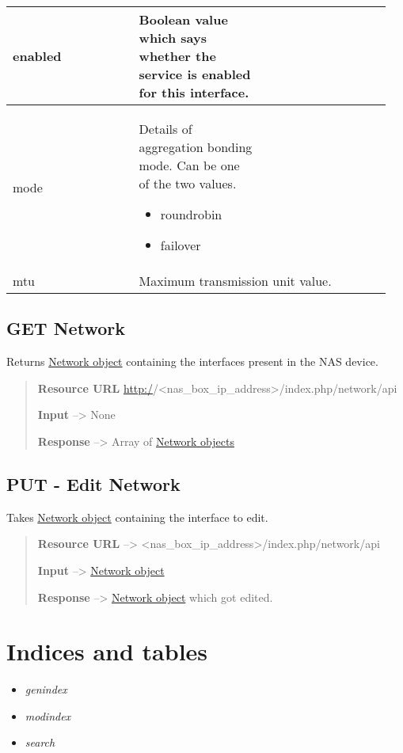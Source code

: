 \documentclass[letterpaper,10pt,english]{sphinxmanual}
\begin{document}
\begin{tabular}{|p{0.317\linewidth}|p{0.317\linewidth}|p{0.317\linewidth}|}
enabled
 & 
\textbf{Boolean} value which says whether the
service is enabled for this interface.
\\\hline

mode
 & 
Details of aggregation bonding mode. Can be
one of the two values.
\begin{itemize}
\item {} 
roundrobin

\item {} 
failover

\end{itemize}
\\\hline

mtu
 &  \multicolumn{2}{l|}{
Maximum transmission unit value.
}\\\hline
\end{tabular}



\section{GET Network}
\label{network:get-network}
Returns {\hyperref[network:network-object-label]{Network object}} containing the interfaces present
in the NAS device.
\begin{quote}

\textbf{Resource URL} \href{http:/}{http:/}/\textless{}nas\_box\_ip\_address\textgreater{}/index.php/network/api

\textbf{Input} --\textgreater{} None

\textbf{Response} --\textgreater{} Array of {\hyperref[network:network-object-label]{Network objects}}
\end{quote}


\section{PUT - Edit Network}
\label{network:put-edit-network}
Takes {\hyperref[network:network-object-label]{Network object}} containing the interface to edit.
\begin{quote}

\textbf{Resource URL} --\textgreater{} \textless{}nas\_box\_ip\_address\textgreater{}/index.php/network/api

\textbf{Input} --\textgreater{} {\hyperref[network:network-object-label]{Network object}}

\textbf{Response} --\textgreater{} {\hyperref[network:network-object-label]{Network object}} which got edited.
\end{quote}


\chapter{Indices and tables}
\label{index:indices-and-tables}\begin{itemize}
\item {} 
\emph{genindex}

\item {} 
\emph{modindex}

\item {} 
\emph{search}

\end{itemize}



\renewcommand{\indexname}{Index}
\printindex
\end{document}
